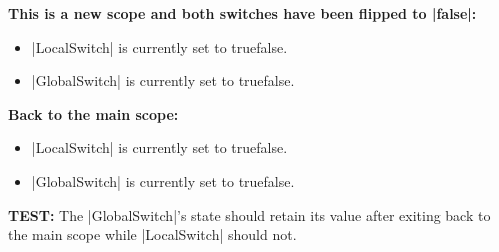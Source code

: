 \begingroup
\singlespacing
\LocalSwitchfalse
\GlobalSwitchfalse
\textbf{This is a new scope and both switches have been flipped to |false|:}
\begin{itemize}
    \item |LocalSwitch| is currently set to \ifLocalSwitch true\else false\fi.
    \item |GlobalSwitch| is currently set to \ifGlobalSwitch true\else false\fi.
\end{itemize}
\endgroup

\textbf{Back to the main scope:}
\begin{itemize}
    \item |LocalSwitch| is currently set to \ifLocalSwitch true\else false\fi.
    \item |GlobalSwitch| is currently set to \ifGlobalSwitch true\else false\fi.
\end{itemize}

\textbf{TEST:} The |GlobalSwitch|'s state should retain its value after exiting back to the main scope while |LocalSwitch| should not.


